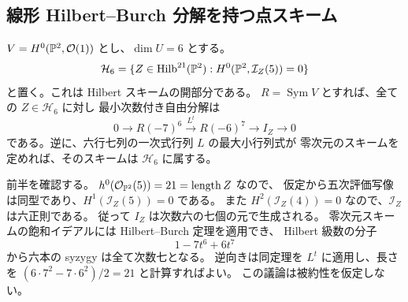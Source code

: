 \subsection{線形 Hilbert--Burch 分解を持つ点スキーム}

$V=H^0(\mathbb P^2,\mathcal O(1))$ とし、$\dim U=6$ とする。
\[
 \mathcal H_6=
 \{Z\in\operatorname{Hilb}^{21}(\mathbb P^2):H^0(\mathbb P^2,\mathcal I_Z(5))=0\}
\]
と置く。これは Hilbert スキームの開部分である。
$R=\operatorname{Sym}V$ とすれば、全ての $Z\in\mathcal H_6$ に対し
最小次数付き自由分解は
\begin{equation}\label{eq:hb-six-resolution-v23}
 0\longrightarrow R(-7)^6\xrightarrow{L^t}
 R(-6)^7\longrightarrow I_Z\longrightarrow0
\end{equation}
である。逆に、六行七列の一次式行列 $L$ の最大小行列式が
零次元のスキームを定めれば、そのスキームは $\mathcal H_6$ に属する。

前半を確認する。
$h^0(\mathcal O_{\mathbb P^2}(5))=21=\operatorname{length}Z$ なので、
仮定から五次評価写像は同型であり、$H^1(\mathcal I_Z(5))=0$ である。
また $H^2(\mathcal I_Z(4))=0$ なので、$\mathcal I_Z$ は六正則である。
従って $I_Z$ は次数六の七個の元で生成される。
零次元スキームの飽和イデアルには Hilbert--Burch 定理\cite{EisenbudSidman,Eisenbud}を適用でき、
Hilbert 級数の分子
\[
 1-7t^6+6t^7
\]
から六本の syzygy は全て次数七となる。
逆向きは同定理を $L^t$ に適用し、長さを
$(6\cdot7^2-7\cdot6^2)/2=21$ と計算すればよい。
この議論は被約性を仮定しない。

